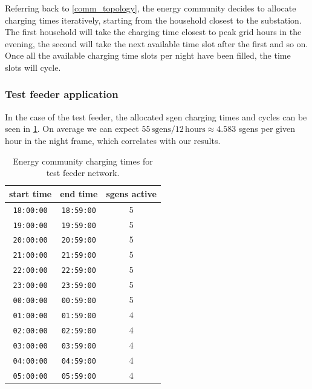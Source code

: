\documentclass[a4paper,10pt]{report}
\begin{document}
Referring back to \cref{comm_topology}, the energy community decides to allocate charging times iteratively, starting from the household closest to the substation. The first household will take the charging time closest to peak grid hours in the evening, the second will take the next available time slot after the first and so on. Once all the available charging time slots per night have been filled, the time slots will cycle.



\subsubsection{Test feeder application}
In the case of the test feeder, the allocated sgen charging times and cycles can be seen in \cref{sgen_comm_times}. On average we can expect $55\, \text{sgens} / 12\, \text{hours} \approx 4.583$ sgens per given hour in the night frame, which correlates with our results.

\begin{table}[htpb]
	\centering
	\begin{tabular}{c c c}
		\toprule
		start time & end time & sgens active \\
		\midrule
		\texttt{18:00:00} & \texttt{18:59:00} & 5\\
		\texttt{19:00:00} & \texttt{19:59:00} & 5\\
		\texttt{20:00:00} & \texttt{20:59:00} & 5\\
		\texttt{21:00:00} & \texttt{21:59:00} & 5\\
		\texttt{22:00:00} & \texttt{22:59:00} & 5\\
		\texttt{23:00:00} & \texttt{23:59:00} & 5\\
		\texttt{00:00:00} & \texttt{00:59:00} & 5\\
		\texttt{01:00:00} & \texttt{01:59:00} & 4\\
		\texttt{02:00:00} & \texttt{02:59:00} & 4\\
		\texttt{03:00:00} & \texttt{03:59:00} & 4\\
		\texttt{04:00:00} & \texttt{04:59:00} & 4\\
		\texttt{05:00:00} & \texttt{05:59:00} & 4\\
		\bottomrule
	\end{tabular}
	\caption[Energy community charging times for test feeder network]{Energy community charging times for test feeder network.}
	\label{sgen_comm_times}
\end{table}
\end{document}
